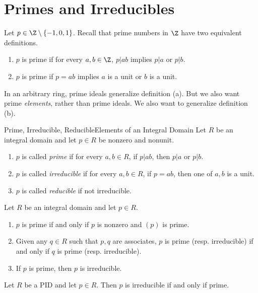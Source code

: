 \documentclass[pmath347]{subfiles}
\begin{document}
    \section{Primes and Irreducibles}
    
    \np Let $p\in\Z\setminus \left\lbrace -1,0,1 \right\rbrace $. Recall that prime numbers in $\Z$ have two equivalent definitions.
    \begin{enumerate}
        \item $p$ is prime if for every $a,b\in\Z$, $p|ab$ implies $p|a$ or $p|b$.
        \item $p$ is prime if $p=ab$ implies $a$ is a unit or $b$ is a unit.
    \end{enumerate}
    In an arbitrary ring, prime ideals generalize definition (a). But we also want prime \textit{elements}, rather than prime ideals. We also want to generalize definition (b).

    \begin{definition}{Prime, Irreducible, Reducible}{Elements of an Integral Domain}
        Let $R$ be an integral domain and let $p\in R$ be nonzero and nonunit.
        \begin{enumerate}
            \item $p$ is called \emph{prime} if for every $a,b\in R$, if $p|ab$, then $p|a$ or $p|b$.
            \item $p$ is called \emph{irreducible} if for every $a,b\in R$, if $p=ab$, then one of $a,b$ is a unit.
            \item $p$ is called \emph{reducible} if not irreducible.
        \end{enumerate}
    \end{definition}

    \begin{prop}{}
        Let $R$ be an integral domain and let $p\in R$.
        \begin{enumerate}
            \item $p$ is prime if and only if $p$ is nonzero and $\left( p \right)$ is prime.
            \item Given any $q\in R$ such that $p,q$ are associates, $p$ is prime (resp. irreducible) if and only if $q$ is prime (resp. irreducible).
            \item If $p$ is prime, then $p$ is irreducible.
        \end{enumerate}
    \end{prop}

    \begin{prop}{}
        Let $R$ be a PID and let $p\in R$. Then $p$ is irreducible if and only if prime.
    \end{prop}
\end{document}
